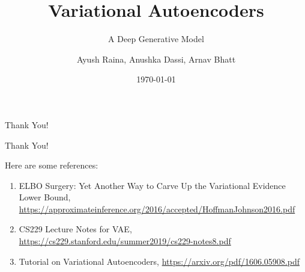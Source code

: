 \documentclass{beamer}
\author{Ayush Raina, Anushka Dassi, Arnav Bhatt}
\title{Variational Autoencoders}
\subtitle{A Deep Generative Model}
\institute{
    Indian Institute of Science \\
}
\date{\today}
\begin{document}
\begin{frame}
    \titlepage
\end{frame}
    





\begin{frame}{Thank You!}
    \begin{center}
        \Huge Thank You!
    \end{center}
    Here are some references:
    \begin{enumerate}
        \item ELBO Surgery: Yet Another Way to Carve Up the Variational Evidence Lower Bound, \url{https://approximateinference.org/2016/accepted/HoffmanJohnson2016.pdf}
        \item CS229 Lecture Notes for VAE, \url{https://cs229.stanford.edu/summer2019/cs229-notes8.pdf}
        \item Tutorial on Variational Autoencoders, \url{https://arxiv.org/pdf/1606.05908.pdf}
    \end{enumerate}
\end{frame}
\end{document}
